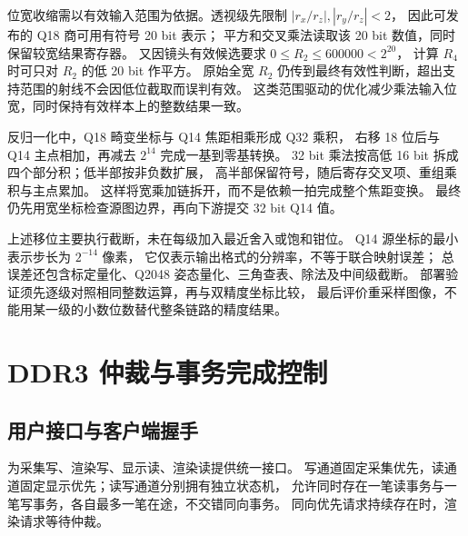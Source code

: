位宽收缩需以有效输入范围为依据。透视级先限制 $|r_x/r_z|,|r_y/r_z|<2$，
因此可发布的 Q18 商可用有符号 20 bit 表示；
平方和交叉乘法读取该 20 bit 数值，同时保留较宽结果寄存器。
又因镜头有效候选要求 $0\le R_2\le600000<2^{20}$，
计算 $R_4$ 时可只对 $R_2$ 的低 20 bit 作平方。
原始全宽 $R_2$ 仍传到最终有效性判断，超出支持范围的射线不会因低位截取而误判有效。
这类范围驱动的优化减少乘法输入位宽，同时保持有效样本上的整数结果一致。

反归一化中，Q18 畸变坐标与 Q14 焦距相乘形成 Q32 乘积，
右移 18 位后与 Q14 主点相加，再减去 $2^{14}$ 完成一基到零基转换。
32 bit 乘法按高低 16 bit 拆成四个部分积；低半部按非负数扩展，
高半部保留符号，随后寄存交叉项、重组乘积与主点累加。
这样将宽乘加链拆开，而不是依赖一拍完成整个焦距变换。
最终仍先用宽坐标检查源图边界，再向下游提交 32 bit Q14 值。

上述移位主要执行截断，未在每级加入最近舍入或饱和钳位。
Q14 源坐标的最小表示步长为 $2^{-14}$ 像素，
它仅表示输出格式的分辨率，不等于联合映射误差；
总误差还包含标定量化、Q2048 姿态量化、三角查表、除法及中间级截断。
部署验证须先逐级对照相同整数运算，再与双精度坐标比较，
最后评价重采样图像，不能用某一级的小数位数替代整条链路的精度结果。

\section{DDR3 仲裁与事务完成控制}
\subsection{用户接口与客户端握手}
 为采集写、渲染写、显示读、渲染读提供统一接口。
写通道固定采集优先，读通道固定显示优先；读写通道分别拥有独立状态机，
允许同时存在一笔读事务与一笔写事务，各自最多一笔在途，不交错同向事务。
同向优先请求持续存在时，渲染请求等待仲裁。

